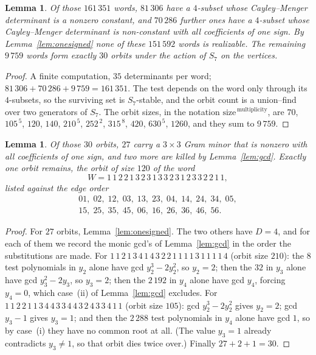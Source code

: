 \documentclass[11pt]{amsart}
\numberwithin{theorem}{section}
\newtheorem{lemma}[theorem]{Lemma}
\theoremstyle{remark}
\theoremstyle{definition}
\begin{document}
\begin{lemma}\label{lem:filter}
Of those $161\,351$ words, $81\,306$ have a $4$-subset whose Cayley--Menger
determinant is a nonzero constant, and $70\,286$ further ones have a $4$-subset
whose Cayley--Menger determinant is non-constant with all coefficients of one
sign. By Lemma~\ref{lem:onesigned} none of these $151\,592$ words is
realizable. The remaining $9\,759$ words form exactly $30$ orbits under the
action of $S_7$ on the vertices.
\end{lemma}

\begin{proof}
A finite computation, $35$ determinants per word; $81\,306+70\,286+9\,759=161\,351$.
The test depends on the word only through its $4$-subsets, so the surviving set
is $S_7$-stable, and the orbit count is a union--find over two generators of
$S_7$. The orbit sizes, in the notation
$\text{size}^{\,\text{multiplicity}}$, are
$70$, $105^{\,5}$, $120$, $140$, $210^{\,5}$, $252^{\,2}$, $315^{\,8}$,
$420$, $630^{\,5}$, $1260$, and they sum to $9\,759$.
\end{proof}

\begin{lemma}\label{lem:elim}
Of those $30$ orbits, $27$ carry a $3\times3$ Gram minor that is nonzero with
all coefficients of one sign, and two more are killed by
Lemma~\ref{lem:gcd}. Exactly one orbit remains, the orbit of size $120$ of the
word
\begin{equation}\label{eq:W}
  W=1\,1\,2\,2\,1\,3\,2\,3\,1\,3\,3\,2\,3\,1\,2\,3\,3\,2\,2\,1\,1 ,
\end{equation}
listed against the edge order
\begin{gather*}
  01,\;02,\;12,\;03,\;13,\;23,\;04,\;14,\;24,\;34,\;05,\\
  15,\;25,\;35,\;45,\;06,\;16,\;26,\;36,\;46,\;56 .
\end{gather*}
\end{lemma}

\begin{proof}
For $27$ orbits, Lemma~\ref{lem:onesigned}. The two others have $D=4$, and for
each of them we record the monic gcd's of Lemma~\ref{lem:gcd} in the order the
substitutions are made. For
$1\,1\,2\,1\,3\,4\,1\,4\,3\,2\,2\,1\,1\,1\,1\,3\,1\,1\,1\,1\,4$
(orbit size $210$): the $8$ test polynomials in $y_2$ alone have gcd
$y_2^3-2y_2^2$, so $y_2=2$; then the $32$ in $y_3$ alone have gcd
$y_3^2-2y_3$, so $y_3=2$; then the $2\,192$ in $y_4$ alone have gcd $y_4$,
forcing $y_4=0$, which case~(ii) of Lemma~\ref{lem:gcd} excludes. For
$1\,1\,2\,2\,1\,1\,3\,4\,4\,3\,3\,4\,4\,3\,2\,4\,3\,3\,4\,1\,1$
(orbit size $105$): gcd $y_2^3-2y_2^2$ gives $y_2=2$; gcd $y_3-1$ gives
$y_3=1$; and then the $2\,288$ test polynomials in $y_4$ alone have gcd $1$, so
by case~(i) they have no common root at all. (The value $y_3=1$ already
contradicts $y_3\ne1$, so that orbit dies twice over.) Finally $27+2+1=30$.
\end{proof}
\end{document}
